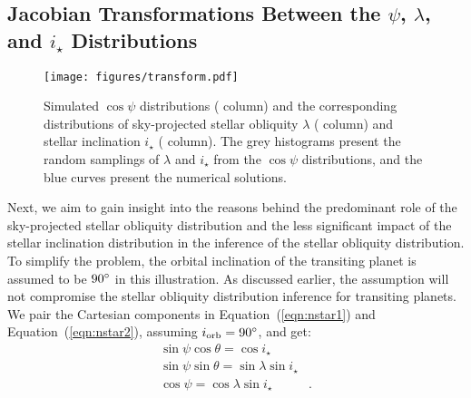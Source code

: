 \documentclass[twocolumn,times]{aastex631}
\begin{document}
\subsection{Jacobian Transformations Between the $\psi$, $\lambda$, and \lowercase{$i_\star$} Distributions}\label{subsec:jacobian}

\begin{figure*}[ht!]
    \centering
    \texttt{[image: figures/transform.pdf]}
    \caption{Simulated $\cos{\psi}$ distributions ( column) and the corresponding distributions of sky-projected stellar obliquity $\lambda$ ( column) and stellar inclination $i_\star$ ( column). The grey histograms present the random samplings of $\lambda$ and $i_\star$ from the $\cos{\psi}$ distributions, and the blue curves present the numerical solutions.}
    \label{fig:transform}
\end{figure*}

Next, we aim to gain insight into the reasons behind the predominant role of the sky-projected stellar obliquity distribution and the less significant impact of the stellar inclination distribution in the inference of the stellar obliquity distribution. To simplify the problem, the orbital inclination of the transiting planet is assumed to be $90\mbox{$^\circ$}$ in this illustration. As discussed earlier, the assumption will not compromise the stellar obliquity distribution inference for transiting planets.
We pair the Cartesian components in Equation~(\ref{eqn:nstar1}) and Equation~(\ref{eqn:nstar2}), assuming $i_{\rm orb} = 90\mbox{$^\circ$}$, and get:
\begin{align}
    \sin{\psi}\cos{\theta} = \cos{i_\star}& \label{eq:coord1}\\
    \sin{\psi}\sin{\theta} = \sin{\lambda}\sin{i_\star}& \label{eq:coord2}\\
    \cos{\psi} = \cos{\lambda}\sin{i_\star} \label{eq:coord3}&.
\end{align}
\end{document}
